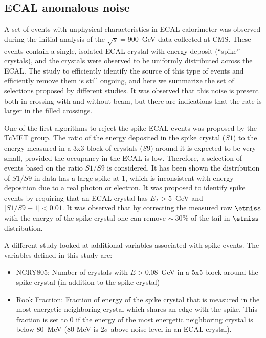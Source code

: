 \subsection{ECAL anomalous noise}

A set of events with unphysical characteristics in ECAL calorimeter was
observed during the initial analysis of the $\sqrt{s}=900$~GeV data
collected at CMS. These events contain a single, isolated ECAL crystal
with energy deposit (``spike'' crystals), and the crystals were observed
to be uniformly distributed across the ECAL. The
study to efficiently identify the source of this type of events and
efficiently remove them is still ongoing, and here we summarize the set
of selections proposed by different studies. It was observed that this
noise is present both in crossing with and without beam, but there are
indications that the rate is larger in the filled crossings.

One of the first algorithms to reject the spike ECAL events was proposed
by the TcMET group. The ratio of the energy deposited in the spike
crystal ($S1$) to the energy measured in a 3x3 block of crystals ($S9$)
around it is expected to be very small, provided the occupancy in the
ECAL is low. Therefore, a selection of events based on the ratio $S1/S9$
is considered. It has been shown the distribution of $S1/S9$ in data has
a large spike at $1$, which is inconsistent with energy deposition due
to a real photon or electron. It was proposed to identify spike events
by requiring that an ECAL crystal has $E_T>5$~GeV and
$|S1/S9-1|<0.01$. It was observed that by correcting the measured raw
$\etmiss$ with the energy of the spike crystal one can remove
$\sim~30\%$ of the tail in $\etmiss$ distribution.

A different study looked at additional variables associated with spike
events. The variables defined in this study are:
\begin{itemize}
\item NCRY805: Number of crystals with $E>0.08$~GeV in a 5x5 block around the
  spike crystal (in addition to the spike crystal)
\item Rook Fraction: Fraction of energy of the spike crystal that is measured in
  the most energetic neighboring crystal which shares an edge with the spike. This
  fraction is set to $0$ if the energy of the most energetic neighboring
  crystal is below $80$~MeV (80 MeV is $2\sigma$ above noise level in an
  ECAL crystal).
\end{itemize}

